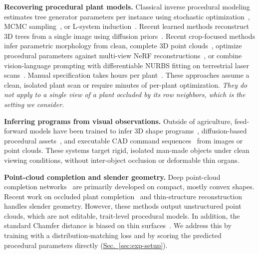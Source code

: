 \documentclass[10pt,twocolumn,letterpaper]{article}
\newcommand{\secref}[1]{\hyperref[#1]{Sec.~\ref*{#1}}}
\begin{document}
\noindent\textbf{Recovering procedural plant models.}
Classical inverse procedural modeling estimates tree generator parameters per instance using stochastic optimization~\citep{stava2014ipmtrees}, MCMC sampling~\citep{talton2011metropolis}, or L-system induction~\citep{guo2020ipmlsys,latentlsys2023}. Recent learned methods reconstruct 3D trees from a single image using diffusion priors~\citep{svdtree2024,lee2024treedfusion}. Recent crop-focused methods infer parametric morphology from clean, complete 3D point clouds~\citep{demeter2025,ghrer2025paramplants}, optimize procedural parameters against multi-view NeRF reconstructions~\citep{cropcraft2026}, or combine vision-language prompting with differentiable NURBS fitting on terrestrial laser scans~\citep{hadadi2026vlmmaize,nurbsdiff2022}. Manual specification takes hours per plant~\citep{floraforge2026}. These approaches assume a clean, isolated plant scan or require minutes of per-plant optimization. \textit{They do not apply to a single view of a plant occluded by its row neighbors, which is the setting we consider.}


\noindent\textbf{Inferring programs from visual observations.}
Outside of agriculture, feed-forward models have been trained to infer 3D shape programs~\citep{shapeprograms2019}, diffusion-based procedural assets~\citep{zhao2025dipcg}, and executable CAD command sequences~\citep{text2cad2024,kolodiazhnyi2025cadrille} from images or point clouds. These systems target rigid, isolated man-made objects under clean viewing conditions, without inter-object occlusion or deformable thin organs.

\noindent\textbf{Point-cloud completion and slender geometry.}
Deep point-cloud completion networks~\citep{yuan2018pcn,yu2021pointr,yu2023adapointr,cai2024einet} are primarily developed on compact, mostly convex shapes. Recent work on occluded plant completion~\citep{lee2026occ} and thin-structure reconstruction~\citep{curvegaussian2025,qi2026rethinking} handles slender geometry. However, these methods output unstructured point clouds, which are not editable, trait-level procedural models. In addition, the standard Chamfer distance is biased on thin surfaces~\citep{wu2021dcd,song2026structural,lin2023infocd}. We address this by training with a distribution-matching loss and by scoring the predicted procedural parameters directly (\secref{sec:exp-setup}).
\end{document}
